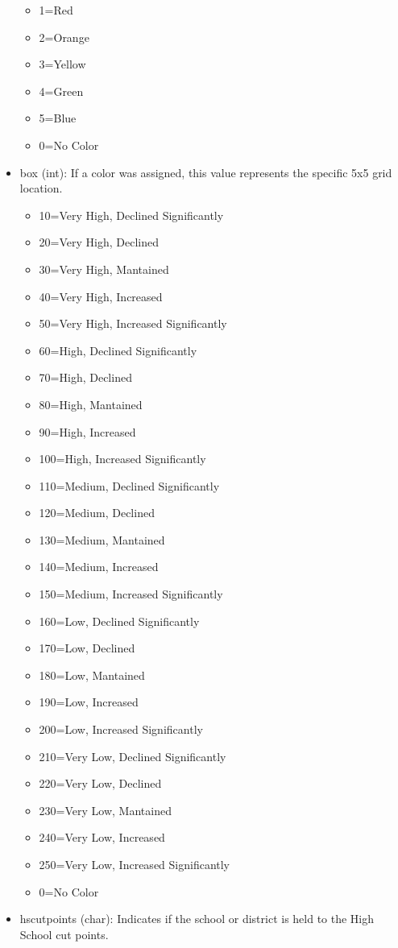 \documentclass[11pt]{article}
\providecommand{\tightlist}{%
      \setlength{\itemsep}{0pt}\setlength{\parskip}{0pt}}
\begin{document}
\begin{itemize}
  \begin{itemize}
  \tightlist
  \item
    1=Red
  \item
    2=Orange
  \item
    3=Yellow
  \item
    4=Green
  \item
    5=Blue
  \item
    0=No Color
  \end{itemize}
\item
  box (int): If a color was assigned, this value represents the specific
  5x5 grid location.

  \begin{itemize}
  \tightlist
  \item
    10=Very High, Declined Significantly
  \item
    20=Very High, Declined
  \item
    30=Very High, Mantained
  \item
    40=Very High, Increased
  \item
    50=Very High, Increased Significantly
  \item
    60=High, Declined Significantly
  \item
    70=High, Declined
  \item
    80=High, Mantained
  \item
    90=High, Increased
  \item
    100=High, Increased Significantly
  \item
    110=Medium, Declined Significantly
  \item
    120=Medium, Declined
  \item
    130=Medium, Mantained
  \item
    140=Medium, Increased
  \item
    150=Medium, Increased Significantly
  \item
    160=Low, Declined Significantly
  \item
    170=Low, Declined
  \item
    180=Low, Mantained
  \item
    190=Low, Increased
  \item
    200=Low, Increased Significantly
  \item
    210=Very Low, Declined Significantly
  \item
    220=Very Low, Declined
  \item
    230=Very Low, Mantained
  \item
    240=Very Low, Increased
  \item
    250=Very Low, Increased Significantly
  \item
    0=No Color
  \end{itemize}
\item
  hscutpoints (char): Indicates if the school or district is held to the
  High School cut points.


\end{itemize}
\end{document}
